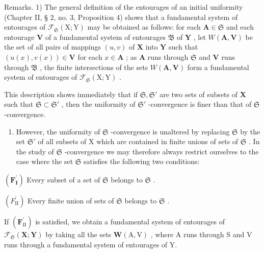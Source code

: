 Remarks. 1) The general definition of the entourages of an initial uniformity (Chapter II, § 2, no. 3, Proposition 4) shows that a fundamental system of entourages of \(\mathcal{F}_{\mathfrak{S}}(\mathrm{X};\mathrm{Y})\) may be obtained as follows: for each \(\mathbf{A}\in \mathfrak{S}\) and each entourage \(\mathbf{V}\) of a fundamental system of entourages \(\mathfrak{B}\) of \(\mathbf{Y}\) , let \(W(\mathbf{A},\mathbf{V})\) be the set of all pairs of mappings \((u,v)\) of \(\mathbf{X}\) into \(\mathbf{Y}\) such that \((u(x),v(x))\in \mathbf{V}\) for each \(x\in \mathbf{A}\) ; as \(\mathbf{A}\) runs through \(\mathfrak{S}\) and \(\mathbf{V}\) runs through \(\mathfrak{B}\) , the finite intersections of the sets \(W(\mathbf{A},\mathbf{V})\) form a fundamental system of entourages of \(\mathcal{F}_{\mathfrak{S}}(\mathrm{X};\mathrm{Y})\) .

This description shows immediately that if \(\mathfrak{S},\mathfrak{S}'\) are two sets of subsets of \(\mathbf{X}\) such that \(\mathfrak{S} \subset \mathfrak{S}'\) , then the uniformity of \(\mathfrak{S}'\) -convergence is finer than that of \(\mathfrak{S}\) -convergence.

\begin{enumerate}
\def\labelenumi{\arabic{enumi})}
\setcounter{enumi}{1}
\tightlist
\item
  However, the uniformity of \(\mathfrak{S}\) -convergence is unaltered by replacing \(\mathfrak{S}\) by the set \(\mathfrak{S}'\) of all subsets of X which are contained in finite unions of sets of \(\mathfrak{S}\) . In the study of \(\mathfrak{S}\) -convergence we may therefore always restrict ourselves to the case where the set \(\mathfrak{S}\) satisfies the following two conditions:
\end{enumerate}

\((\mathbf{F}_{\mathbf{I}}^{\prime})\) Every subset of a set of \(\mathfrak{S}\) belongs to \(\mathfrak{S}\) .

\((F_{\mathrm{II}}^{\prime})\) Every finite union of sets of \(\mathfrak{S}\) belongs to \(\mathfrak{S}\) .

If \((\mathbf{F}_{\mathrm{II}}^{\prime})\) is satisfied, we obtain a fundamental system of entourages of \(\mathcal{F}_{\mathfrak{S}}(\mathbf{X};\mathbf{Y})\) by taking all the sets \(\boldsymbol{W}(\mathrm{A},\mathrm{V})\) , where A runs through S and V runs through a fundamental system of entourages of Y.

